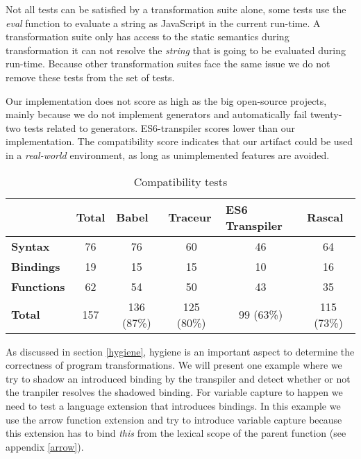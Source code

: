 Not all tests can be satisfied by a transformation suite alone, some tests use the \textit{eval} function to evaluate a string as JavaScript in the current run-time. A transformation suite only has access to the static semantics during transformation it can not resolve the \textit{string} that is going to be evaluated during run-time. Because other transformation suites face the same issue we do not remove these tests from the set of tests. 

Our implementation does not score as high as the big open-source projects, mainly because we do not implement generators and automatically fail twenty-two tests related to generators. ES6-transpiler scores lower than our implementation. The compatibility score indicates that our artifact could be used in a \textit{real-world} environment, as long as unimplemented features are avoided.

\begin{table}[h]
\centering
\caption{Compatibility tests} \label{tab:compatibility}
\begin{tabular}{@{}lccccc@{}}
\toprule
                & {\bf Total} & \multicolumn{1}{l}{{\bf Babel}} & \multicolumn{1}{l}{{\bf Traceur}} & \multicolumn{1}{l}{{\bf ES6 Transpiler}} & \multicolumn{1}{l}{{\bf Rascal}} \\ \midrule
{\bf Syntax}    & 76          & 76                              & 60                     & 46           & 64                               \\
{\bf Bindings}  & 19          & 15                              & 15                     & 10           & 16                               \\
{\bf Functions} & 62          & 54                              & 50                     & 43           & 35                               \\
{\bf Total}     & 157         & 136 (87\%)                      & 125 (80\%)             & 99 (63\%)    & 115 (73\%)                        \\ \bottomrule
\end{tabular}
\end{table}

As discussed in section \ref{hygiene}, hygiene is an important aspect to determine the correctness of program transformations. We will present one example where we try to shadow an introduced binding by the transpiler and detect whether or not the tranpiler resolves the shadowed binding. For variable capture to happen we need to test a language extension that introduces bindings. In this example we use the arrow function extension and try to introduce variable capture because this extension has to bind \textit{this} from the lexical scope of the parent function (see appendix \ref{arrow}).

